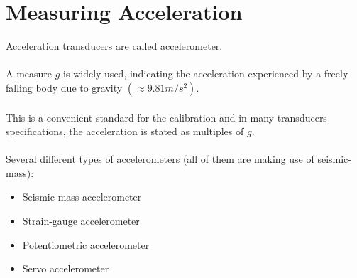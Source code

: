 \section{Measuring Acceleration}
Acceleration transducers are called accelerometer. \\\\
A measure $g$ is widely used, indicating the acceleration experienced by a freely falling body due to gravity $(\approx 9.81 m/s^2)$. \\\\
This is a convenient standard for the calibration and in many transducers specifications, the acceleration is stated as multiples of $g$. \\\\
Several different types of accelerometers (all of them are making use of seismic-mass):
\begin{itemize}
  \item Seismic-mass accelerometer
  \item Strain-gauge accelerometer
  \item Potentiometric accelerometer
  \item Servo accelerometer
\end{itemize}
